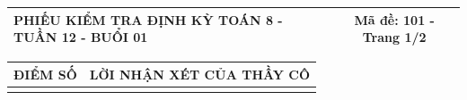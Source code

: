 \documentclass[12pt,a4paper]{article}
\begin{document}
\pagestyle{empty}
\noindent
\begin{tabularx}{\linewidth}{|X|c|}
\hline
\textbf{PHIẾU KIỂM TRA ĐỊNH KỲ TOÁN 8 - TUẦN 12 - BUỔI 01} & \textbf{Mã đề: 101 - Trang 1/2} \\
\hline
\end{tabularx}

\vspace{1.0mm}

\noindent
\begin{tabularx}{\linewidth}{|p{3.2cm}|X|}
\hline
\centering\textbf{ĐIỂM SỐ} & \centering\textbf{LỜI NHẬN XÉT CỦA THẦY CÔ} \tabularnewline
\hline
\rule{0pt}{1.8cm} & \tabularnewline
\hline
\end{tabularx}
\end{document}
